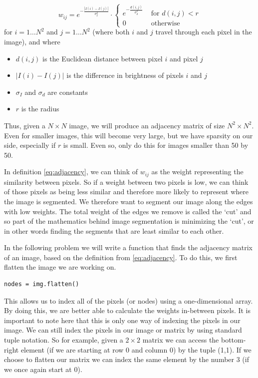 \begin{equation}
\label{eq:adjacency}
w_{ij} = e^{-\frac{|I(i) - I(j)|}{\sigma_I^2}} \cdot \begin{cases} e^{-\frac{d(i,j)}{\sigma_d^2}} & \mbox{ for $d(i,j) < r$} \\ 0 & \mbox{ otherwise} \end{cases}
\end{equation}
for $i = 1 \hdots N^2$ and $j = 1 \hdots N^2$ (where both $i$ and $j$ travel through each pixel in the image), and where
\begin{itemize}
	\item$d(i,j)$ is the Euclidean distance between pixel $i$ and pixel $j$
	\item $|I(i) - I(j)|$ is the difference in brightness of pixels $i$ and $j$
	\item $\sigma_I$ and $\sigma_d$ are constants
	\item $r$ is the radius
\end{itemize}
Thus, given a $N\times N$ image, we will produce an adjacency matrix of size $N^2\times N^2$.
Even for smaller images, this will become very large, but we have sparsity on our side, especially if $r$ is small. Even so, only do this for images smaller than 50 by 50.

In definition \eqref{eq:adjacency}, we can think of $w_{ij}$ as the weight representing the similarity between pixels. So if a weight between two pixels is low, we can think of those pixels as being less similar and therefore more likely to represent where the image is segmented. We therefore want to segment our image along the edges with low weights. The total weight of the edges we remove is called the `cut' and so part of the mathematics behind image segmentation is minimizing the `cut', or in other words finding the segments that are least similar to each other.



In the following problem we will write a function that finds the adjacency matrix of an image, based on the definition from \eqref{eq:adjacency}. To do this, we first flatten the image we are working on. 

\begin{lstlisting}
nodes = img.flatten()
\end{lstlisting}

This allows us to index all of the pixels (or nodes) using a one-dimensional array. By doing this, we are better able to calculate the weights in-between pixels. It is important to note here that this is only one way of indexing the pixels in our image. We can still index the pixels in our image or matrix by using standard tuple notation. So for example, given a $2 \times 2$ matrix we can access the bottom-right element (if we are starting at row 0 and column 0) by the tuple (1,1). If we choose to flatten our matrix we can index the same element by the number 3 (if we once again start at 0).

